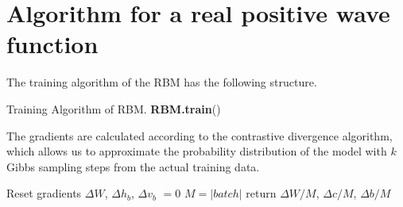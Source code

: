 \documentclass[submission, Phys]{SciPost}
\begin{document}
\section{Algorithm for a real positive wave function}
The training algorithm of the RBM has the following structure.
 
\begin{algorithm}[H]
	 \caption{Training Algorithm of RBM. \textbf{RBM.train}() }
  \SetAlgoLined
 
\end{algorithm}


The gradients are calculated according to the contrastive divergence algorithm, which allows us to approximate the probability distribution of the model with $k$ Gibbs sampling steps from the actual training data.

\begin{algorithm}[H]
	 \caption{Compute Gradient from Batch. \textbf{\lstinline{RBM.compute_batch_gradients}}(k, batch) }
  \SetAlgoLined
  Reset gradients $\Delta W$, $\Delta h_b$, $\Delta v_b$ $= 0$\;
 $M = \vert batch \vert$ \;
 return $\Delta W / M$,  $\Delta c / M$, $\Delta b / M$
\end{algorithm}
\end{document}
